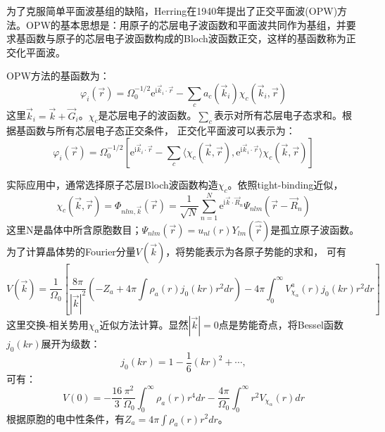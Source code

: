 为了克服简单平面波基组的缺陷，Herring在1940年提出了正交平面波(OPW)方法\cite{PR57-1169_1940}。OPW的基本思想是：用原子的芯层电子波函数和平面波共同作为基组，并要求基函数与原子的芯层电子波函数构成的Bloch波函数正交，这样的基函数称为正交化平面波。

OPW方法的基函数为：
\begin{equation}
	\varphi_i(\vec r)=\Omega_0^{-1/2}\mathrm{e}^{\mathrm{i}\vec k_i\cdot\vec r}-\sum_ca_c(\vec k_i)\chi_c(\vec k_i,\vec r)
  \label{eq:OPW-set}
\end{equation}
这里$\vec k_i=\vec k+\vec G_i$。$\chi_c$是芯层电子的波函数。$\sum\limits_c$表示对所有芯层电子态求和。根据基函数与所有芯层电子态正交条件，
正交化平面波可以表示为：
\begin{equation}
	\varphi_i(\vec r)=\Omega_0^{-1/2}\left[\mathrm{e}^{\mathrm{i}\vec k_i\cdot\vec r}-\sum_c\langle\chi_c(\vec k,\vec r),\mathrm{e}^{\mathrm{i}\vec k_i\cdot\vec r}\rangle\chi_c(\vec k,\vec r)\right]
  \label{eq:solid-85}
\end{equation}

实际应用中，通常选择原子芯层Bloch波函数构造$\chi_c$。依照tight-binding近似\cite{Huang-Han}，
$$\chi_c(\vec k,\vec r)=\Phi_{nlm,\vec k}(\vec r)=\frac1{\sqrt N}\sum_{n=1}^N\mathrm{e}^{\mathrm{i}\vec k\cdot\vec R_n}\Psi_{nlm}(\vec r-\vec R_n)$$
这里N是晶体中所含原胞数目；$\Psi_{nlm}(\vec r)=u_{nl}(r)Y_{lm}(\hat{\vec r})$是孤立原子波函数。为了计算晶体势的Fourier分量$V(\vec k)$，将势能表示为各原子势能的求和，%
可有\cite{Euwema-Stukel-Collins}
\begin{equation}
  V(\vec k)=\frac1{\Omega_0}\left[\frac{8\pi}{|\vec k|^2}\left(-Z_a+4\pi\int\rho_a(r)j_0(kr)r^2dr\right)-4\pi\int_0^{\infty}V_{\chi_{\alpha}}^a(r)j_0(kr)r^2dr\right]
  \label{eq:solid-87}
\end{equation}
这里交换-相关势用$\chi_\alpha$近似方法计算。显然$|\vec k|=0$点是势能奇点，将Bessel函数$j_0(kr)$展开为级数：
$$j_0(kr)=1-\frac16(kr)^2+\cdots,$$可有：
\begin{equation}
  V(0)=-\frac{16}3\frac{\pi^2}{\Omega_0}\int_0^{\infty}\rho_a(r)r^4dr-\frac{4\pi}{\Omega_0}\int_0^{\infty}r^2V_{\chi_{\alpha}}(r)dr
  \label{eq:solid-88}
\end{equation}
根据原胞的电中性条件，有$Z_a=4\pi\int\rho_a(r)r^2dr$。

